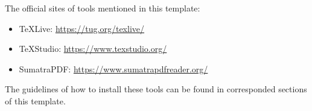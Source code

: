 \documentclass[winfonts,mf,twoside,AutoFakeBold = {2}]{njuthesis}
\begin{document}
\begin{englishabstract}
	The official sites of tools mentioned in this template:
	
	\begin{itemize}
		\item TeXLive: \url{https://tug.org/texlive/}
		\item TeXStudio: \url{https://www.texstudio.org/}
		\item SumatraPDF: \url{https://www.sumatrapdfreader.org/}
	\end{itemize}

	The guidelines of how to install these tools can be found in corresponded sections of this template.
\end{englishabstract}

%
%
%

\tableofcontents

\listoffigures

\listoftables

\mainmatter



\end{document}
